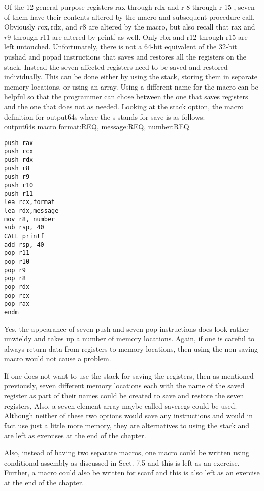 \documentclass[10pt]{article}
\begin{document}
Of the 12 general purpose registers rax through rdx and r 8 through r 15 , seven of them have their contents altered by the macro and subsequent procedure call. Obviously $r \mathrm{cx}, \mathrm{rdx}$, and $r 8$ are altered by the macro, but also recall that rax and $r 9$ through r11 are altered by printf as well. Only rbx and r12 through r15 are left untouched. Unfortunately, there is not a 64-bit equivalent of the 32-bit pushad and popad instructions that saves and restores all the registers on the stack. Instead the seven affected registers need to be saved and restored individually. This can be done either by using the stack, storing them in separate memory locations, or using an array. Using a different name for the macro can be helpful so that the programmer can chose between the one that saves registers and the one that does not as needed. Looking at the stack option, the macro definition for output64s where the s stands for save is as follows:\\
output64s macro format:REQ, message:REQ, number:REQ

\begin{verbatim}
push rax
push rcx
push rdx
push r8
push r9
push r10
push r11
lea rcx,format
lea rdx,message
mov r8, number
sub rsp, 40
CALL printf
add rsp, 40
pop r11
pop r10
pop r9
pop r8
pop rdx
pop rcx
pop rax
endm
\end{verbatim}

Yes, the appearance of seven push and seven pop instructions does look rather unwieldy and takes up a number of memory locations. Again, if one is careful to always return data from registers to memory locations, then using the non-saving macro would not cause a problem.

If one does not want to use the stack for saving the registers, then as mentioned previously, seven different memory locations each with the name of the saved register as part of their names could be created to save and restore the seven registers, Also, a seven element array maybe called saveregs could be used. Although neither of these two options would save any instructions and would in fact use just a little more memory, they are alternatives to using the stack and are left as exercises at the end of the chapter.

Also, instead of having two separate macros, one macro could be written using conditional assembly as discussed in Sect. 7.5 and this is left as an exercise. Further, a macro could also be written for scanf and this is also left as an exercise at the end of the chapter.
\end{document}
